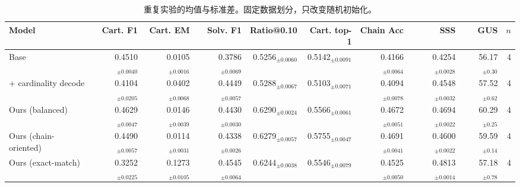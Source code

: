 \begin{table}[t]
\centering
\small
\caption{重复实验的均值与标准差。固定数据划分，只改变随机初始化。}
\label{tab:repeats}
\begin{tabular}{lrrrrrrrrr}
\toprule
Model & Cart. F1 & Cart. EM & Solv. F1 & Ratio@0.10 & Cart. top-1 & Chain Acc & SSS & GUS & $n$ \\
\midrule
Base & 0.4510$_{\pm 0.0040}$ & 0.0105$_{\pm 0.0016}$ & 0.3786$_{\pm 0.0069}$ & 0.5256$_{\pm 0.0060}$ & 0.5142$_{\pm 0.0091}$ & 0.4166$_{\pm 0.0064}$ & 0.4254$_{\pm 0.0028}$ & 56.17$_{\pm 0.30}$ & 4 \\
+ cardinality decode & 0.4104$_{\pm 0.0205}$ & 0.0402$_{\pm 0.0068}$ & 0.4449$_{\pm 0.0057}$ & 0.5288$_{\pm 0.0067}$ & 0.5103$_{\pm 0.0071}$ & 0.4094$_{\pm 0.0078}$ & 0.4548$_{\pm 0.0032}$ & 57.52$_{\pm 0.62}$ & 4 \\
Ours (balanced) & 0.4629$_{\pm 0.0047}$ & 0.0146$_{\pm 0.0039}$ & 0.4430$_{\pm 0.0030}$ & 0.6290$_{\pm 0.0024}$ & 0.5566$_{\pm 0.0061}$ & 0.4672$_{\pm 0.0051}$ & 0.4694$_{\pm 0.0022}$ & 60.29$_{\pm 0.25}$ & 4 \\
Ours (chain-oriented) & 0.4490$_{\pm 0.0057}$ & 0.0114$_{\pm 0.0031}$ & 0.4338$_{\pm 0.0026}$ & 0.6279$_{\pm 0.0057}$ & 0.5755$_{\pm 0.0047}$ & 0.4691$_{\pm 0.0041}$ & 0.4600$_{\pm 0.0022}$ & 59.59$_{\pm 0.14}$ & 4 \\
Ours (exact-match) & 0.3252$_{\pm 0.0225}$ & 0.1273$_{\pm 0.0105}$ & 0.4545$_{\pm 0.0064}$ & 0.6244$_{\pm 0.0038}$ & 0.5546$_{\pm 0.0079}$ & 0.4525$_{\pm 0.0050}$ & 0.4813$_{\pm 0.0014}$ & 57.18$_{\pm 0.78}$ & 4 \\
\bottomrule
\end{tabular}
\vspace{2pt}{\footnotesize 该表给出判定改动是否真实有效的门槛：差距小于 2 个标准差的不应声称显著。}
\end{table}
